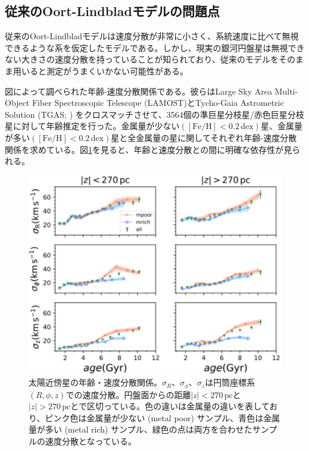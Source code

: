 \subsection{従来のOort-Lindbladモデルの問題点} %
従来のOort-Lindbladモデルは速度分散が非常に小さく、系統速度に比べて無視できるような系を仮定したモデルである。しかし、現実の銀河円盤星は無視できない大きさの速度分散を持っていることが知られており、従来のモデルをそのまま用いると測定がうまくいかない可能性がある。

図\cite{YL18}によって調べられた年齢-速度分散関係である。彼らはLarge Sky Area Multi-Object Fiber Spectroscopic Telescope (LAMOST)とTycho-Gaia Astrometric Solution (TGAS; \cite{Gaia2016}) をクロスマッチさせて、3564個の準巨星分枝星/赤色巨星分枝星に対して年齢推定を行った。金属量が少ない$([\mathrm{Fe}/\mathrm{H}] < 0.2\,\mathrm{dex})$星、金属量が多い$([\mathrm{Fe}/\mathrm{H}] < 0.2\,\mathrm{dex})$星と全金属量の星に関してそれぞれ年齢-速度分散関係を求めている。図\ref{VDbyYL18}を見ると、年齢と速度分散との間に明確な依存性が見られる。

\begin{figure}[htbp]
\begin{center}
	\includegraphics[width=12cm]{fig/YuLiu18_VD.pdf}
	\caption{太陽近傍星の年齢・速度分散関係\cite{YL18}。$\sigma_R、\sigma_{\phi}、\sigma_z$は円筒座標系$(R,\phi,z)$での速度分散。円盤面からの距離$|z|<270\,\mathrm{pc}$と$|z|>270\,\mathrm{pc}$とで区切っている。色の違いは金属量の違いを表しており、ピンク色は金属量が少ない (metal poor) サンプル、青色は金属量が多い (metal rich) サンプル、緑色の点は両方を合わせたサンプルの速度分散となっている。}
	\label{VDbyYL18}
\end{center}
\end{figure}

